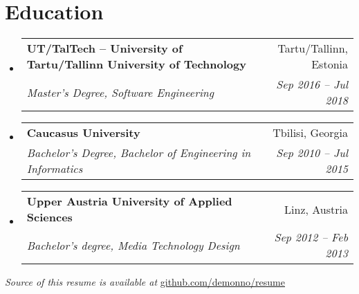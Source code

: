 \documentclass[letterpaper,11pt]{article}
\makeatletter
\newcommand{\resumeSubheading}[4]{
  \vspace{-1pt}\item
    \begin{tabular*}{0.97\textwidth}{l@{\extracolsep{\fill}}r}
      \textbf{#1} & #2 \\
      \textit{\small#3} & \textit{\small #4} \\
    \end{tabular*}\vspace{-5pt}
}
\newcommand{\resumeSubHeadingListStart}{\begin{itemize}[leftmargin=*]}
\newcommand{\resumeSubHeadingListEnd}{\end{itemize}}
\newcommand{\link}[2]{\href{#1}{\underline{#2}}}
\makeatother
\begin{document}
\section{Education}
  \resumeSubHeadingListStart
    \resumeSubheading
      {UT/TalTech – University of Tartu/Tallinn University of Technology}{Tartu/Tallinn, Estonia}
      {Master’s Degree, Software Engineering}{Sep 2016 – Jul 2018}
    \resumeSubheading
      {Caucasus University}{Tbilisi, Georgia}
      {Bachelor’s Degree, Bachelor of Engineering in Informatics}{Sep 2010 – Jul 2015}
    \resumeSubheading
      {Upper Austria University of Applied Sciences}{Linz, Austria}
      {Bachelor's degree, Media Technology Design}{Sep 2012 – Feb 2013}
  \resumeSubHeadingListEnd


\textit{Source of this resume is available at} \link{https://github.com/demonno/resume}{github.com/demonno/resume}
\end{document}

